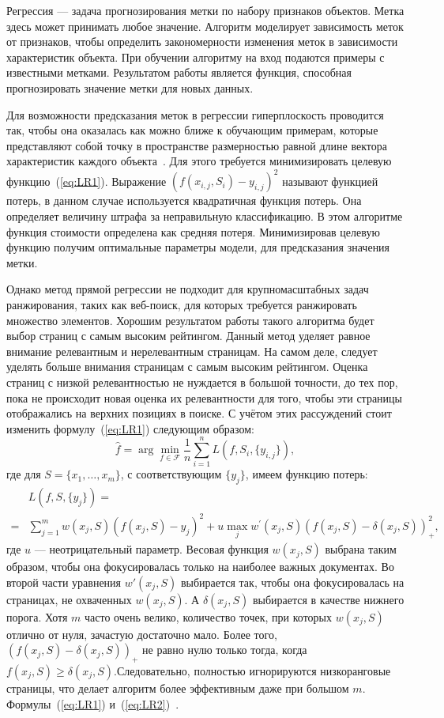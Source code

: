 Регрессия --- задача прогнозирования метки по набору признаков объектов. Метка здесь может принимать любое значение. Алгоритм моделирует зависимость меток от признаков, чтобы определить закономерности изменения меток в зависимости характеристик объекта. При обучении алгоритму на вход подаются примеры с известными метками. Результатом работы является функция, способная прогнозировать значение метки для новых данных. 

Для возможности предсказания меток в регрессии гиперплоскость проводится так, чтобы  она оказалась как можно ближе к обучающим примерам, которые представляют собой точку в пространстве размерностью равной длине вектора характеристик каждого объекта~\cite{ML_no_wors}. Для этого требуется минимизировать целевую функцию~(\ref{eq:LR1}). Выражение $(f(x_{i, j}, S_i)-y_{i, j})^2$ называют функцией потерь, в данном случае используется квадратичная функция потерь. Она определяет величину штрафа за неправильную классификацию. В этом алгоритме функция стоимости определена как средняя потеря. Минимизировав целевую функцию получим оптимальные параметры модели, для предсказания значения метки.

Однако метод прямой регрессии не подходит для крупномасштабных задач ранжирования, таких как веб-поиск, для которых требуется ранжировать множество элементов. Хорошим результатом работы такого алгоритма будет выбор страниц с самым высоким рейтингом. Данный метод уделяет равное внимание релевантным и нерелевантным страницам. На самом деле, следует уделять больше внимания страницам с самым высоким рейтингом. Оценка страниц с низкой релевантностью не нуждается в большой точности, до тех пор, пока не происходит новая оценка их релевантности для того, чтобы эти страницы отображались на верхних позициях в поиске. С учётом этих рассуждений стоит изменить формулу~(\ref{eq:LR1}) следующим образом:
\begin{equation}
			\label{eq:LR2}
		\hat{f}=\arg \min _{f \in \mathcal{F}}
		\frac{1}{n} \sum_{i=1}^n L(f, S_i,\{y_{i, j}\}),
\end{equation}
где для $S = \{x_{1}, \dots, x_{m}\}$, с соответствующим $\{y_{j}\}$, имеем функцию потерь:
\[
\begin{aligned}
	& L(f, S,\{y_j\})= \\
	= & \sum_{j=1}^m w(x_j, S)(f(x_j, S)-y_j)^2+u \max_j w^{\prime}(x_j, S)(f(x_j, S)-\delta(x_j, S))_{+}^2,
\end{aligned}
\]
где $u$ --- неотрицательный параметр. Весовая функция $w(x_j, S)$ выбрана таким образом, чтобы она фокусировалась только на наиболее важных документах. Во второй части уравнения $w'(x_j, S)$ выбирается так, чтобы она фокусировалась на страницах, не охваченных $w(x_j, S)$.  А $\delta(x_j, S)$ выбирается в качестве нижнего порога. Хотя $m$ часто очень велико, количество точек, при которых $w(x_j, S)$ отлично от нуля, зачастую достаточно мало. Более того, $(f(x_j, S)-\delta(x_j, S))_{+}$ не равно нулю только тогда, когда $f(x_j, S) \geq \delta(x_j, S)$.Следовательно, полностью игнорируются низкоранговые страницы, что делает алгоритм более эффективным даже при большом $m$. Формулы~(\ref{eq:LR1}) и~(\ref{eq:LR2})~\cite{LR}. 

